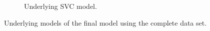\begin{figure}[ht]
\begin{subfigure}{.45\textwidth}
        \captionsetup{width=0.8\linewidth}
        \captionsetup{justification=centering}
        \caption{Underlying SVC model.}
    \end{subfigure}
    \captionsetup{width=0.9\linewidth}
    \captionsetup{justification=centering}
    \caption{Underlying models of the final model using the complete data set.}
\end{figure}


